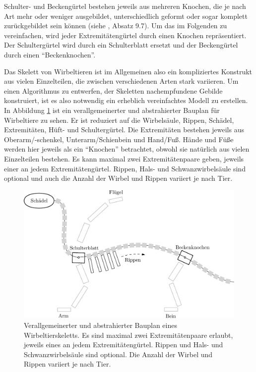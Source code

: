 Schulter- und Beckengürtel bestehen  jeweils aus mehreren Knochen, die je nach Art mehr oder weniger ausgebildet, unterschiedlich geformt oder sogar komplett zurückgebildet sein können (siehe \cite{Vergleichende_Anatomie}, Absatz 9.7). Um das im Folgenden zu vereinfachen, wird jeder Extremitätengürtel durch einen Knochen repräsentiert. Der Schultergürtel wird durch ein Schulterblatt ersetzt und der Beckengürtel durch einen "`Beckenknochen"'.

Das Skelett von Wirbeltieren ist im Allgemeinen also ein kompliziertes Konstrukt aus vielen Einzelteilen, die zwischen verschiedenen Arten stark variieren. Um einen Algorithmus zu entwerfen, der Skeletten nachempfundene Gebilde konstruiert, ist es also notwendig ein erheblich vereinfachtes Modell zu erstellen.\\ 
In Abbildung \ref{bauplan_skelett} ist ein verallgemeinerter und abstrahierter Bauplan für Wirbeltiere zu sehen. Er ist reduziert auf die Wirbelsäule, Rippen, Schädel, Extremitäten, Hüft- und Schultergürtel. Die Extremitäten bestehen jeweils aus Oberarm/-schenkel, Unterarm/Schienbein und Hand/Fuß. Hände und Füße werden hier jeweils als ein "`Knochen"' betrachtet, obwohl sie natürlich aus vielen Einzelteilen bestehen. Es kann maximal zwei Extremitätenpaare geben, jeweils einer an jedem Extremitätengürtel. Rippen, Hals- und Schwanzwirbelsäule sind optional und auch die Anzahl der Wirbel und Rippen variiert je nach Tier.

\begin{figure}
 \centering
 \includegraphics[width=\textwidth]{graphics/skeletonPlan}
 \caption{Verallgemeinerter und abstrahierter Bauplan eines Wirbeltierskeletts. Es sind maximal zwei Extremitätenpaare erlaubt, jeweils eines an jedem Extremitätengürtel. Rippen und Hals- und Schwanzwirbelsäule sind optional. Die Anzahl der Wirbel und Rippen variiert je nach Tier.}
 \label{bauplan_skelett}
\end{figure}


